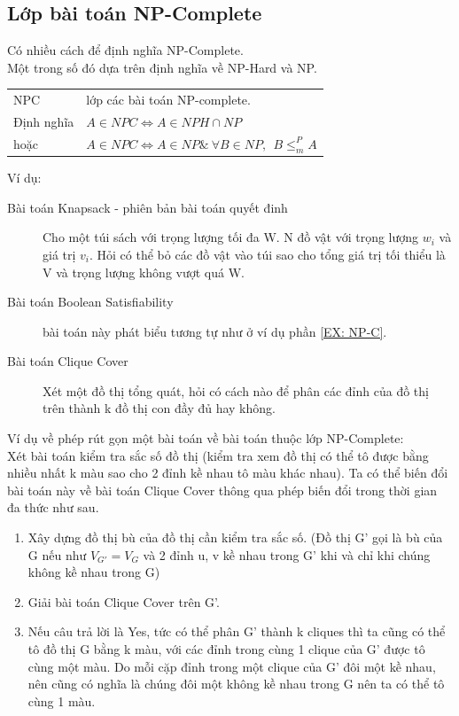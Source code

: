 \documentclass[a4paper 14pt]{article}
\begin{document}
		\subsection{Lớp bài toán NP-Complete}
			Có nhiều cách để định nghĩa NP-Complete.\\
			Một trong số đó dựa trên định nghĩa về NP-Hard và NP.\\
			\begin{addmargin}{0.5in}
				\begin{tabular}{l l}
				NPC & lớp các bài toán NP-complete.\\
				Định nghĩa & $A \in NPC \Leftrightarrow A \in NPH \cap NP$\\
				hoặc & $A \in NPC \Leftrightarrow A \in NP\&~\forall B \in NP,~~B \leq^{P}_{m}A$\\
				\end{tabular}
			\end{addmargin}
			Ví dụ:
			\begin{description}
				\item[Bài toán Knapsack - phiên bản bài toán quyết đinh]  Cho một túi sách với trọng lượng tối đa W. N đồ vật với trọng lượng $w_{i}$ và giá trị $v_{i}$. Hỏi có thể bỏ các đồ vật vào túi sao cho tổng giá trị tối thiểu là V và trọng lượng không vượt quá W.
				\item[Bài toán Boolean Satisfiability] bài toán này phát biểu tương tự như ở ví dụ phần \ref{EX: NP-C}.
				\item[Bài toán Clique Cover] Xét một đồ thị tổng quát, hỏi có cách nào để phân các đỉnh của đồ thị trên thành k đồ thị con đầy đủ hay không.
			\end{description}
			Ví dụ về phép rút gọn một bài toán về bài toán thuộc lớp NP-Complete:\\
			Xét bài toán kiểm tra sắc số đồ thị (kiểm tra xem đồ thị có thể tô được bằng nhiều nhất k màu sao cho 2 đỉnh kề nhau tô màu khác nhau). Ta có thể biến đổi bài toán này về bài toán Clique Cover thông qua phép biến đổi trong thời gian đa thức như sau.\\
			\begin{enumerate}
				\item Xây dựng đồ thị bù của đồ thị cần kiểm tra sắc số. (Đồ thị G' gọi là bù của G nếu như $V_{G'} = V_{G}$ và 2 đỉnh u, v kề nhau trong G' khi và chỉ khi chúng không kề nhau trong G)
				\item Giải bài toán Clique Cover trên G'.
				\item Nếu câu trả lời là Yes, tức có thể phân G' thành k cliques thì ta cũng có thể tô đồ thị G bằng k màu, với các đỉnh trong cùng 1 clique của G' được tô cùng một màu. Do mỗi cặp đỉnh trong một clique của G' đôi một kề nhau, nên cũng có nghĩa là chúng đôi một không kề nhau trong G nên ta có thể tô cùng 1 màu.
			\end{enumerate}
\end{document}
